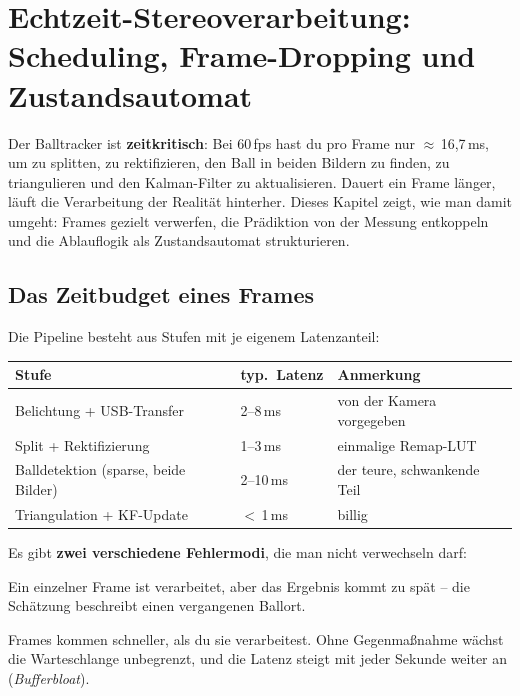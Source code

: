 
\chapter{Echtzeit-Stereoverarbeitung: Scheduling, Frame-Dropping und Zustandsautomat}

Der Balltracker ist \textbf{zeitkritisch}: Bei 60\,fps hast du pro Frame nur
$\approx$\,16{,}7\,ms, um zu splitten, zu rektifizieren, den Ball in beiden
Bildern zu finden, zu triangulieren und den Kalman-Filter zu aktualisieren.
Dauert ein Frame länger, läuft die Verarbeitung der Realität hinterher. Dieses
Kapitel zeigt, wie man damit umgeht: Frames gezielt verwerfen, die Prädiktion von
der Messung entkoppeln und die Ablauflogik als Zustandsautomat strukturieren.

\section{Das Zeitbudget eines Frames}
Die Pipeline besteht aus Stufen mit je eigenem Latenzanteil:
\begin{longtable}{@{}p{6.0cm}p{3.0cm}p{5.0cm}@{}}
\toprule
\textbf{Stufe} & \textbf{typ.\ Latenz} & \textbf{Anmerkung} \\
\midrule
Belichtung + USB-Transfer & 2--8\,ms & von der Kamera vorgegeben \\
Split + Rektifizierung    & 1--3\,ms & einmalige Remap-LUT \\
Balldetektion (sparse, beide Bilder) & 2--10\,ms & der teure, schwankende Teil \\
Triangulation + KF-Update & $<$\,1\,ms & billig \\
\bottomrule
\end{longtable}

\noindent Es gibt \textbf{zwei verschiedene Fehlermodi}, die man nicht verwechseln
darf:
\begin{description}[style=nextline,leftmargin=1.4em]
\item[Latenz (zu alt).] Ein einzelner Frame ist verarbeitet, aber das Ergebnis
  kommt zu spät -- die Schätzung beschreibt einen vergangenen Ballort.
\item[Durchsatz (Stau).] Frames kommen schneller, als du sie verarbeitest. Ohne
  Gegenmaßnahme wächst die Warteschlange unbegrenzt, und die Latenz steigt mit
  jeder Sekunde weiter an (\emph{Bufferbloat}).
\end{description}

